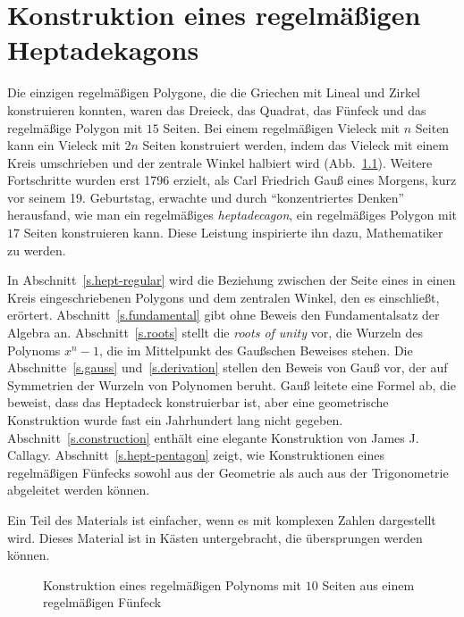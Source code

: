 

\chapter{Konstruktion eines regelmäßigen Heptadekagons}\label{c.heptadecagon}


Die einzigen regelmäßigen Polygone, die die Griechen mit Lineal und Zirkel konstruieren konnten, waren das Dreieck, das Quadrat, das Fünfeck und das regelmäßige Polygon mit $15$ Seiten. Bei einem regelmäßigen Vieleck mit $n$ Seiten kann ein Vieleck mit $2n$ Seiten konstruiert werden, indem das Vieleck mit einem Kreis umschrieben und der zentrale Winkel halbiert wird (Abb.~\ref{f.hept-double}). Weitere Fortschritte wurden erst 1796 erzielt, als Carl Friedrich Gauß eines Morgens, kurz vor seinem 19. Geburtstag, erwachte und durch ``konzentriertes Denken'' herausfand, wie man ein regelmäßiges \emph{heptadecagon}, ein regelmäßiges Polygon mit $17$ Seiten konstruieren kann. Diese Leistung inspirierte ihn dazu, Mathematiker zu werden.

In Abschnitt~\ref{s.hept-regular} wird die Beziehung zwischen der Seite eines in einen Kreis eingeschriebenen Polygons und dem zentralen Winkel, den es einschließt, erörtert. Abschnitt~\ref{s.fundamental} gibt ohne Beweis den Fundamentalsatz der Algebra an. Abschnitt~\ref{s.roots} stellt die \emph{roots of unity} vor, die Wurzeln des Polynoms $x^n-1$, die im Mittelpunkt des Gaußschen Beweises stehen. Die Abschnitte~\ref{s.gauss} und~\ref{s.derivation} stellen den Beweis von Gauß vor, der auf Symmetrien der Wurzeln von Polynomen beruht. Gauß leitete eine Formel ab, die beweist, dass das Heptadeck konstruierbar ist, aber eine geometrische Konstruktion wurde fast ein Jahrhundert lang nicht gegeben. Abschnitt~\ref{s.construction} enthält eine elegante Konstruktion von James J. Callagy. Abschnitt~\ref{s.hept-pentagon} zeigt, wie Konstruktionen eines regelmäßigen Fünfecks sowohl aus der Geometrie als auch aus der Trigonometrie abgeleitet werden können.

Ein Teil des Materials ist einfacher, wenn es mit komplexen Zahlen dargestellt wird. Dieses Material ist in Kästen untergebracht, die übersprungen werden können.
\begin{figure}[b]
\begin{center}
\end{center}
\caption{Konstruktion eines regelmäßigen Polynoms mit $10$ Seiten aus einem regelmäßigen Fünfeck}\label{f.hept-double}
\end{figure}

